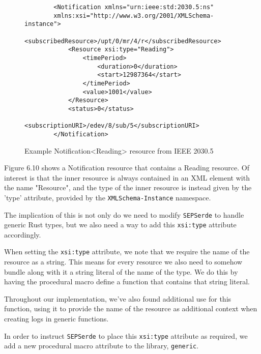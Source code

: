 \begin{figure}[H]
    \begin{center}
        \begin{lstlisting}
        <Notification xmlns="urn:ieee:std:2030.5:ns" 
        xmlns:xsi="http://www.w3.org/2001/XMLSchema-instance">
            <subscribedResource>/upt/0/mr/4/r</subscribedResource>
            <Resource xsi:type="Reading">
                <timePeriod>
                    <duration>0</duration>
                    <start>12987364</start>
                </timePeriod>
                <value>1001</value>
            </Resource>
            <status>0</status>
            <subscriptionURI>/edev/8/sub/5</subscriptionURI>
        </Notification>        
        \end{lstlisting}
        \label{fig:notifxml}
        \caption{Example Notification<Reading> resource from IEEE 2030.5}
    \end{center}
\end{figure}

Figure 6.10 shows a Notification resource that contains a Reading resource. Of interest is that the inner resource is always contained in an XML element with the name "Resource", and the type of the inner resource is instead given by the 'type' attribute, provided by the \texttt{XMLSchema-Instance} namespace. 

The implication of this is not only do we need to modify \texttt{SEPSerde} to handle generic Rust types, but we also need a way to add this  \texttt{xsi:type} attribute accordingly.

When setting the \texttt{xsi:type} attribute, we note that we require the name of the resource as a string. This means for every resource we also need to somehow bundle along with it a string literal of the name of the type. We do this by having the procedural macro define a function that contains that string literal.

Throughout our implementation, we've also found additional use for this function, using it to provide the name of the resource as additional context when creating logs in generic functions.

In order to instruct \texttt{SEPSerde} to place this \texttt{xsi:type} attribute as required, we add a new procedural macro attribute to the library, \texttt{generic}.

